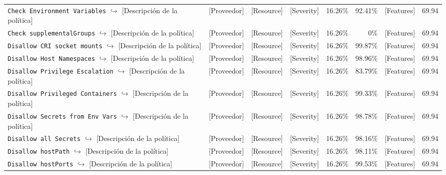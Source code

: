 \begin{table}[ht]
\begin{tabular}{lcccrrrr}
\makecell[l]{\texttt{Check Environment Variables} \\ $\hookrightarrow$ [Descripción de la política]} & [Proveedor] & [Resource] & [Severity] & 16.26\% & 92.41\% & [Features] & 69.94 \\
\makecell[l]{\texttt{Check supplementalGroups} \\ $\hookrightarrow$ [Descripción de la política]} & [Proveedor] & [Resource] & [Severity] & 16.26\% & 0\% & [Features] & 69.94 \\
\makecell[l]{\texttt{Disallow CRI socket mounts} \\ $\hookrightarrow$ [Descripción de la política]} & [Proveedor] & [Resource] & [Severity] & 16.26\% & 99.87\% & [Features] & 69.94 \\
\makecell[l]{\texttt{Disallow Host Namespaces} \\ $\hookrightarrow$ [Descripción de la política]} & [Proveedor] & [Resource] & [Severity] & 16.26\% & 98.96\% & [Features] & 69.94 \\
\makecell[l]{\texttt{Disallow Privilege Escalation} \\ $\hookrightarrow$ [Descripción de la política]} & [Proveedor] & [Resource] & [Severity] & 16.26\% & 83.79\% & [Features] & 69.94 \\
\makecell[l]{\texttt{Disallow Privileged Containers} \\ $\hookrightarrow$ [Descripción de la política]} & [Proveedor] & [Resource] & [Severity] & 16.26\% & 99.33\% & [Features] & 69.94 \\
\makecell[l]{\texttt{Disallow Secrets from Env Vars} \\ $\hookrightarrow$ [Descripción de la política]} & [Proveedor] & [Resource] & [Severity] & 16.26\% & 98.78\% & [Features] & 69.94 \\
\makecell[l]{\texttt{Disallow all Secrets} \\ $\hookrightarrow$ [Descripción de la política]} & [Proveedor] & [Resource] & [Severity] & 16.26\% & 98.16\% & [Features] & 69.94 \\
\makecell[l]{\texttt{Disallow hostPath} \\ $\hookrightarrow$ [Descripción de la política]} & [Proveedor] & [Resource] & [Severity] & 16.26\% & 98.11\% & [Features] & 69.94 \\
\makecell[l]{\texttt{Disallow hostPorts} \\ $\hookrightarrow$ [Descripción de la política]} & [Proveedor] & [Resource] & [Severity] & 16.26\% & 99.53\% & [Features] & 69.94 \\

\end{tabular}
\end{table}
